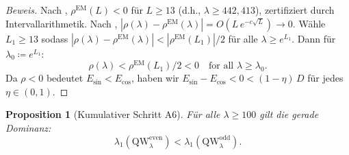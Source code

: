 \documentclass[12pt,a4paper]{article}
\newtheorem{proposition}[theorem]{Proposition}
\theoremstyle{definition}
\theoremstyle{remark}
\begin{document}
\begin{proof}[Beweis]
Nach , $\rho^{\mathrm{EM}}(L) < 0$ für $L \geq 13$ (d.h., $\lambda \geq 442{,}413$), zertifiziert durch Intervallarithmetik. Nach , $|\rho(\lambda) - \rho^{\mathrm{EM}}(\lambda)| = O(L\,e^{-c\sqrt{L}}) \to 0$. Wähle $L_1 \geq 13$ sodass $|\rho(\lambda) - \rho^{\mathrm{EM}}(\lambda)| < |\rho^{\mathrm{EM}}(L_1)|/2$ für alle $\lambda \geq e^{L_1}$. Dann für $\lambda_0 \coloneqq e^{L_1}$:
\[
  \rho(\lambda) < \rho^{\mathrm{EM}}(L_1)/2 < 0 \quad\text{for all } \lambda \geq \lambda_0.
\]
Da $\rho < 0$ bedeutet $E_{\sin} < E_{\cos}$, haben wir $E_{\sin} - E_{\cos} < 0 < (1-\eta)\,D$ für jedes $\eta \in (0,1)$.
\end{proof}

\begin{proposition}[Kumulativer Schritt A6]
\label{prop:A6}
Für alle $\lambda \geq 100$ gilt die gerade Dominanz:
\[
  \lambda_1(\mathrm{QW}_\lambda^{\mathrm{even}}) < \lambda_1(\mathrm{QW}_\lambda^{\mathrm{odd}}).
\]
\end{proposition}
\end{document}
